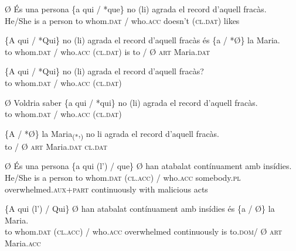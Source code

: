 \documentclass[output=paper,colorlinks,citecolor=brown,modfonts,nonflat]{langsci/langscibook}
\begin{document}
 

\ea%
 \label{ex:royo:15}
 
 \ea\label{ex:royo:15a} Ø És una persona \{a qui / *que\} no (li) agrada el record d’aquell fracàs.\\
  He/She is a person to whom.\textsc{dat} / who.\textsc{acc} doesn’t (\textsc{cl.dat}) likes\\
\glt {}
 
 \ex \label{ex:royo:15b}
 \gll  \{A qui / *Qui\} no (li) agrada el record d’aquell fracàs és \{a / *Ø\} la Maria.\\
  to whom.\textsc{dat} / who.\textsc{acc} (\textsc{cl.dat}) is to / Ø \textsc{art} Maria.\textsc{dat} \\
\glt {}
 
 
 
 \ex \label{ex:royo:15c}
 \gll \{A qui / *Qui\} no (li) agrada el record d’aquell fracàs?\\
 to whom.\textsc{dat} / who.\textsc{acc} (\textsc{cl.dat}) \\
\glt {}
 
 \ex \label{ex:royo:15d}
 \gll Ø Voldria saber \{a qui / *qui\} no (li) agrada el record d’aquell fracàs.\\
  to whom.\textsc{dat} / who.\textsc{acc} (\textsc{cl.dat}) \\
\glt {}
 
 \ex \label{ex:royo:15e}
 \gll \{A / *Ø\} la Maria\textsubscript{(*},\textsubscript{)} no li agrada el record d’aquell fracàs.\\
 to / Ø \textsc{art} Maria.\textsc{dat} \textsc{cl.dat} \\
\glt {}
 
 \z
 \z

 
\ea%
 \label{ex:royo:16}
 \ea \label{ex:royo:16a}
 \gll Ø És una persona \{a qui (l’) / que\} Ø han atabalat contínuament amb insídies.\\
 He/She is a person to whom.\textsc{dat} (\textsc{cl.acc}) / who.\textsc{acc} somebody.\textsc{pl} overwhelmed.\textsc{aux}+\textsc{part} continuously with malicious acts\\
\glt {}
 
 \ex \label{ex:royo:16b}
	\gll \{A qui (l’) / Qui\} Ø han atabalat contínuament amb insídies és \{a / Ø\} la Maria.\\
	 to whom.\textsc{dat} (\textsc{cl.acc}) / who.\textsc{acc} overwhelmed continuously is to.\textsc{dom}/ Ø \textsc{art} Maria.\textsc{acc}\\
	\glt {} 
	
\end{document}
